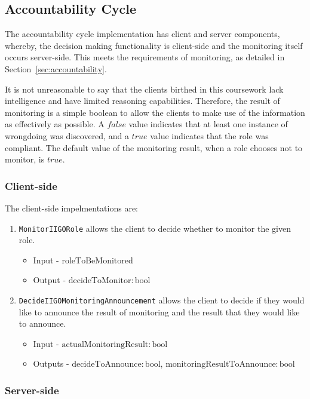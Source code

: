 \subsection{Accountability Cycle}
The accountability cycle implementation has client and server components, whereby, the decision making functionality is client-side and the monitoring itself occurs server-side. This meets the requirements of monitoring, as detailed in Section~\ref{sec:accountability}.

It is not unreasonable to say that the clients birthed in this coursework lack intelligence and have limited reasoning capabilities. Therefore, the result of monitoring is a simple boolean to allow the clients to make use of the information as effectively as possible. A $false$ value indicates that at least one instance of wrongdoing was discovered, and a $true$ value indicates that the role was compliant. The default value of the monitoring result, when a role chooses not to monitor, is $true$.

\subsubsection{Client-side}
The client-side impelmentations are:
\begin{enumerate}
    \item \texttt{MonitorIIGORole} allows the client to decide whether to monitor the given role. 
    \begin{itemize}
        \item Input - $\mathrm{roleToBeMonitored}$
        \item Output - $\mathrm{decideToMonitor:bool}$
    \end{itemize} 
    \item \texttt{DecideIIGOMonitoringAnnouncement} allows the client to decide if they would like to announce the result of monitoring and the result that they would like to announce. 
    \begin{itemize}
        \item Input - $\mathrm{actualMonitoringResult:bool}$
        \item Outputs - $\mathrm{decideToAnnounce:bool}$, $\mathrm{monitoringResultToAnnounce:bool}$
    \end{itemize} 
\end{enumerate}
\subsubsection{Server-side}

